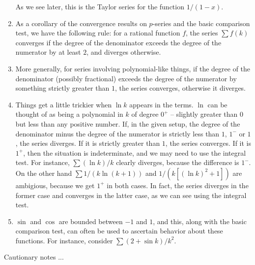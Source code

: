 \documentclass[10pt]{amsart}
\begin{document}
\begin{enumerate}
  As we see later, this is the Taylor series for the function $1/(1 - x)$.
\item As a corollary of the convergence results on $p$-series and the
  basic comparison test, we have the following rule: for a rational
  function $f$, the series $\sum f(k)$ converges if the degree of the
  denominator exceeds the degree of the numerator by at least $2$, and
  diverges otherwise.
\item More generally, for series involving polynomial-like things, if
  the degree of the denominator (possibly fractional) exceeds the
  degree of the numerator by something strictly greater than $1$, the
  series converges, otherwise it diverges.
\item Things get a little trickier when $\ln k$ appears in the
  terms. $\ln$ can be thought of as being a polynomial in $k$ of
  degree $0^+$ -- slightly greater than $0$ but less than any positive
  number. If, in the given setup, the degree of the denominator minus
  the degree of the numerator is strictly less than $1$, $1^-$ or $1$,
  the series diverges. If it is strictly greater than $1$, the series
  converges. If it is $1^+$, then the situation is indeterminate, and
  we may need to use the integral test. For instance, $\sum (\ln k)/k$
  clearly diverges, because the difference is $1^-$. On the other hand
  $\sum 1/(k \ln (k+1))$ and $1/(k[(\ln k)^2 + 1])$ are ambigious,
  because we get $1^+$ in both cases. In fact, the series diverges in
  the former case and converges in the latter case, as we can see
  using the integral test.
\item $\sin$ and $\cos$ are bounded between $-1$ and $1$, and this,
  along with the basic comparison test, can often be used to ascertain
  behavior about these functions. For instance, consider $\sum (2 +
  \sin k)/k^2$.
\end{enumerate}

Cautionary notes ...
\end{document}
